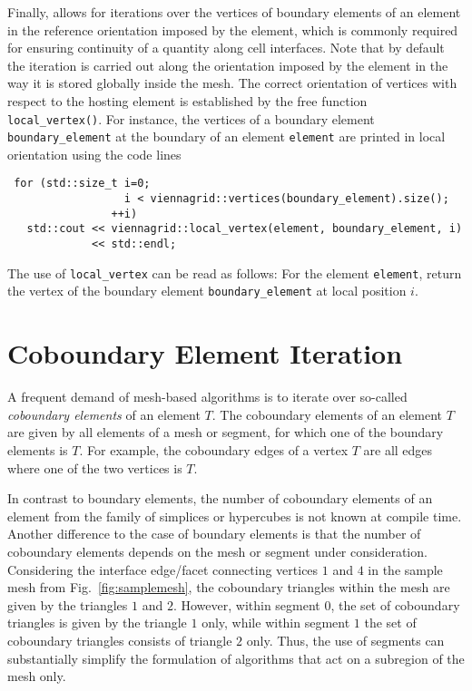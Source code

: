
Finally, {\ViennaGrid} allows for iterations over the vertices of boundary elements of an element in the reference orientation imposed by the element, which is commonly required for ensuring continuity of a quantity along cell interfaces. Note that by default the iteration is carried out along the orientation imposed by the element in the way it is stored globally inside the mesh.
The correct orientation of vertices with respect to the hosting element is established by the free function \lstinline|local_vertex()|.
For instance, the vertices of a boundary element \lstinline|boundary_element| at the boundary of an element \lstinline|element| are printed in local orientation using the code lines
\begin{lstlisting}
 for (std::size_t i=0;
                  i < viennagrid::vertices(boundary_element).size();
                ++i)
   std::cout << viennagrid::local_vertex(element, boundary_element, i)
             << std::endl;
\end{lstlisting}
The use of \lstinline|local_vertex| can be read as follows: For the element \lstinline|element|, return the vertex of the boundary element \lstinline|boundary_element| at local position $i$.

\section{Coboundary Element Iteration}
A frequent demand of mesh-based algorithms is to iterate over so-called \emph{coboundary elements} of an element $T$.
The coboundary elements of an element $T$ are given by all elements of a mesh or segment, for which one of the boundary elements is $T$.
For example, the coboundary edges of a vertex $T$ are all edges where one of the two vertices is $T$.

In contrast to boundary elements, the number of coboundary elements of an element from the family of simplices or hypercubes is not known at compile time.
Another difference to the case of boundary elements is that the number of coboundary elements depends on the mesh or segment under consideration.
Considering the interface edge/facet connecting vertices $1$ and $4$ in the sample mesh from Fig.~\ref{fig:samplemesh}, the coboundary triangles within the mesh are given by the triangles $1$ and $2$.
However, within segment $0$, the set of coboundary triangles is given by the triangle $1$ only, while within segment $1$ the set of coboundary triangles consists of triangle $2$ only.
Thus, the use of segments can substantially simplify the formulation of algorithms that act on a subregion of the mesh only.

